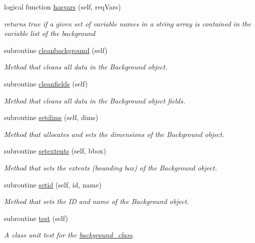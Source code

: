 \begin{DoxyCompactItemize}
logical function \mbox{\hyperlink{namespacebackground__mod_aaea077e7c8efb080233831f42e90bd9a}{hasvars}} (self, req\+Vars)
\begin{DoxyCompactList}\small\item\em returns true if a given set of variable names in a string array is contained in the variable list of the background \end{DoxyCompactList}\item 
subroutine \mbox{\hyperlink{namespacebackground__mod_a1610fcc9ce260beb3c35418e92a63391}{cleanbackground}} (self)
\begin{DoxyCompactList}\small\item\em Method that cleans all data in the Background object. \end{DoxyCompactList}\item 
subroutine \mbox{\hyperlink{namespacebackground__mod_a843a471a68ce83809e3ed0a40886a4e7}{cleanfields}} (self)
\begin{DoxyCompactList}\small\item\em Method that cleans all data in the Background object fields. \end{DoxyCompactList}\item 
subroutine \mbox{\hyperlink{namespacebackground__mod_a06d96d4627391d74feb105a842a87dc0}{setdims}} (self, dims)
\begin{DoxyCompactList}\small\item\em Method that allocates and sets the dimensions of the Background object. \end{DoxyCompactList}\item 
subroutine \mbox{\hyperlink{namespacebackground__mod_ae8871564866fdd657a25f6a5a2256c33}{setextents}} (self, bbox)
\begin{DoxyCompactList}\small\item\em Method that sets the extents (bounding box) of the Background object. \end{DoxyCompactList}\item 
subroutine \mbox{\hyperlink{namespacebackground__mod_a4feaccf688558d8590ece4f09c65c977}{setid}} (self, id, name)
\begin{DoxyCompactList}\small\item\em Method that sets the ID and name of the Background object. \end{DoxyCompactList}\item 
subroutine \mbox{\hyperlink{namespacebackground__mod_a3cee95b9b5d3aae83df33334981f2b27}{test}} (self)
\begin{DoxyCompactList}\small\item\em A class \textquotesingle{}unit\textquotesingle{} test for the \mbox{\hyperlink{structbackground__mod_1_1background__class}{background\+\_\+class}}. \end{DoxyCompactList}\item 

\end{DoxyCompactItemize}
